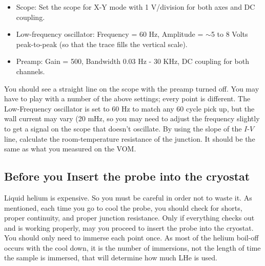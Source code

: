 \documentclass{../lab}
\begin{document}
\begin{itemize}
    \item Scope: Set the scope for X-Y mode with 1 V/division for both axes and DC coupling.

    \item Low-frequency oscillator: Frequency = 60 Hz, Amplitude = $\sim$5 to 8 Volts peak-to-peak (so that the trace fills the vertical scale).

    \item Preamp: Gain = 500, Bandwidth 0.03 Hz - 30 KHz, DC coupling for both channels.
\end{itemize}

You should see a straight line on the scope with the preamp turned off. You may have to play with a number of the above settings; every point is different. The Low-Frequency oscillator is set to 60 Hz to match any 60 cycle pick up, but the wall current may vary (20 mHz, so you may need to adjust the frequency slightly to get a signal on the scope that doesn't oscillate. By using the slope of the $I$-$V$ line, calculate the room-temperature resistance of the junction. It should be the same as what you measured on the VOM.


\subsection{Before you Insert the probe into the cryostat}

Liquid helium is expensive. So you must be careful in order not to waste it. As mentioned, each time you go to cool the probe, you should check for shorts, proper continuity, and proper junction resistance. Only if everything checks out and is working properly, may you proceed to insert the probe into the cryostat. You should only need to immerse each point once. As most of the helium boil-off occurs with the cool down, it is the number of immersions, not the length of time the sample is immersed, that will determine how much LHe is used.
\end{document}
